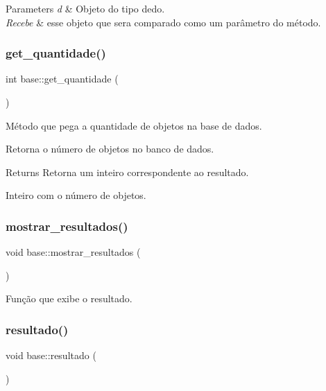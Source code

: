 \begin{DoxyParams}{Parameters}
{\em d} & Objeto do tipo dedo.\\
\hline
{\em Recebe} & esse objeto que sera comparado como um parâmetro do método. \\
\hline
\end{DoxyParams}
\mbox{\label{classbase_a8d7e8978652ae605ab038286cfeb24fb}} 
\subsubsection{\texorpdfstring{get\+\_\+quantidade()}{get\_quantidade()}}
{\footnotesize\ttfamily int base\+::get\+\_\+quantidade (\begin{DoxyParamCaption}{ }\end{DoxyParamCaption})}



Método que pega a quantidade de objetos na base de dados. 

Retorna o número de objetos no banco de dados.

\begin{DoxyReturn}{Returns}
Retorna um inteiro correspondente ao resultado.

Inteiro com o número de objetos. 
\end{DoxyReturn}
\mbox{\label{classbase_a4de5d06607b9f92a158d8dd88d9775fc}} 
\subsubsection{\texorpdfstring{mostrar\+\_\+resultados()}{mostrar\_resultados()}}
{\footnotesize\ttfamily void base\+::mostrar\+\_\+resultados (\begin{DoxyParamCaption}{ }\end{DoxyParamCaption})}



Função que exibe o resultado. 

\mbox{\label{classbase_a4d2dd9457866115cc595e612b340c04f}} 
\subsubsection{\texorpdfstring{resultado()}{resultado()}}
{\footnotesize\ttfamily void base\+::resultado (\begin{DoxyParamCaption}{ }\end{DoxyParamCaption})}



